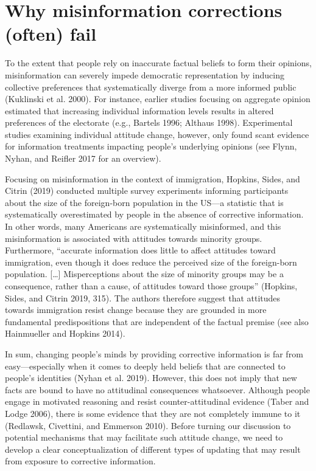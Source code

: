 \documentclass[
  12pt,
]{article}
\begin{document}
\hypertarget{why-misinformation-corrections-often-fail}{%
\section{Why misinformation corrections (often)
fail}\label{why-misinformation-corrections-often-fail}}

To the extent that people rely on inaccurate factual beliefs to form
their opinions, misinformation can severely impede democratic
representation by inducing collective preferences that systematically
diverge from a more informed public (Kuklinski et al. 2000). For
instance, earlier studies focusing on aggregate opinion estimated that
increasing individual information levels results in altered preferences
of the electorate (e.g., Bartels 1996; Althaus 1998). Experimental
studies examining individual attitude change, however, only found scant
evidence for information treatments impacting people's underlying
opinions (see Flynn, Nyhan, and Reifler 2017 for an overview).

Focusing on misinformation in the context of immigration, Hopkins,
Sides, and Citrin (2019) conducted multiple survey experiments informing
participants about the size of the foreign-born population in the US---a
statistic that is systematically overestimated by people in the absence
of corrective information. In other words, many Americans are
systematically misinformed, and this misinformation is associated with
attitudes towards minority groups. Furthermore, ``accurate information
does little to affect attitudes toward immigration, even though it does
reduce the perceived size of the foreign-born population. {[}\ldots{]}
Misperceptions about the size of minority groups may be a consequence,
rather than a cause, of attitudes toward those groups'' (Hopkins, Sides,
and Citrin 2019, 315). The authors therefore suggest that attitudes
towards immigration resist change because they are grounded in more
fundamental predispositions that are independent of the factual premise
(see also Hainmueller and Hopkins 2014).

In sum, changing people's minds by providing corrective information is
far from easy---especially when it comes to deeply held beliefs that are
connected to people's identities (Nyhan et al. 2019). However, this does
not imply that new facts are bound to have no attitudinal consequences
whatsoever. Although people engage in motivated reasoning and resist
counter-attitudinal evidence (Taber and Lodge 2006), there is some
evidence that they are not completely immune to it (Redlawsk, Civettini,
and Emmerson 2010). Before turning our discussion to potential
mechanisms that may facilitate such attitude change, we need to develop
a clear conceptualization of different types of updating that may result
from exposure to corrective information.
\end{document}
